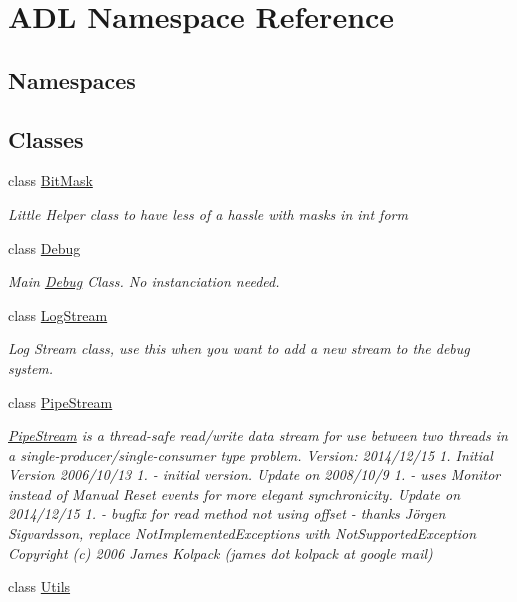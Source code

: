 \hypertarget{namespace_a_d_l}{}\section{A\+DL Namespace Reference}
\label{namespace_a_d_l}
\subsection*{Namespaces}
\begin{DoxyCompactItemize}
\end{DoxyCompactItemize}
\subsection*{Classes}
\begin{DoxyCompactItemize}
\item 
class \mbox{\hyperlink{class_a_d_l_1_1_bit_mask}{Bit\+Mask}}
\begin{DoxyCompactList}\small\item\em Little Helper class to have less of a hassle with masks in int form \end{DoxyCompactList}\item 
class \mbox{\hyperlink{class_a_d_l_1_1_debug}{Debug}}
\begin{DoxyCompactList}\small\item\em Main \mbox{\hyperlink{class_a_d_l_1_1_debug}{Debug}} Class. No instanciation needed. \end{DoxyCompactList}\item 
class \mbox{\hyperlink{class_a_d_l_1_1_log_stream}{Log\+Stream}}
\begin{DoxyCompactList}\small\item\em Log Stream class, use this when you want to add a new stream to the debug system. \end{DoxyCompactList}\item 
class \mbox{\hyperlink{class_a_d_l_1_1_pipe_stream}{Pipe\+Stream}}
\begin{DoxyCompactList}\small\item\em \mbox{\hyperlink{class_a_d_l_1_1_pipe_stream}{Pipe\+Stream}} is a thread-\/safe read/write data stream for use between two threads in a single-\/producer/single-\/consumer type problem. Version\+: 2014/12/15 1. Initial Version 2006/10/13 1. -\/ initial version. Update on 2008/10/9 1. -\/ uses Monitor instead of Manual Reset events for more elegant synchronicity. Update on 2014/12/15 1. -\/ bugfix for read method not using offset -\/ thanks Jörgen Sigvardsson, replace Not\+Implemented\+Exceptions with Not\+Supported\+Exception Copyright (c) 2006 James Kolpack (james dot kolpack at google mail) \end{DoxyCompactList}\item 
class \mbox{\hyperlink{class_a_d_l_1_1_utils}{Utils}}
\end{DoxyCompactItemize}
